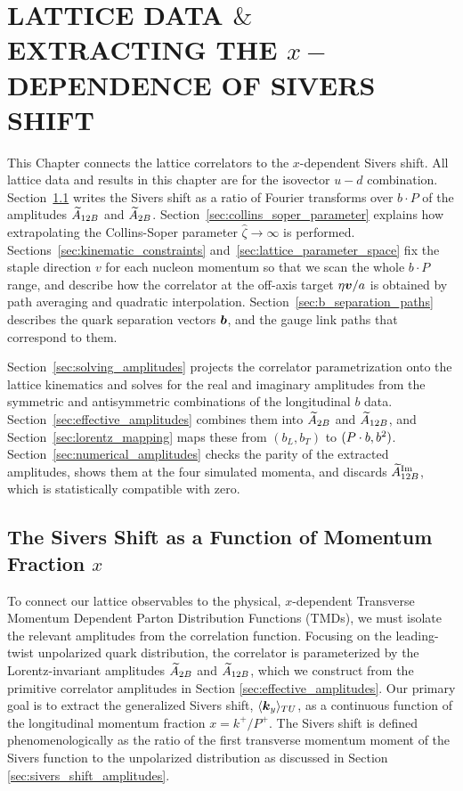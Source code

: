 \section{LATTICE DATA \texorpdfstring{$\&$}{\&} EXTRACTING THE \texorpdfstring{$x-$}{x-}DEPENDENCE OF SIVERS SHIFT}
\label{sec:x_dependence}

This Chapter connects the lattice correlators to the $x$-dependent Sivers shift. All lattice data and results in this chapter are for the isovector $u-d$ combination. Section~\ref{sec:sivers_shift_x} writes the Sivers shift as a ratio of Fourier transforms over $b\cdot P$ of the amplitudes $\widetilde{A}_{12B}$ and $\widetilde{A}_{2B}$. Section~\ref{sec:collins_soper_parameter} explains how extrapolating the Collins-Soper parameter $\hat{\zeta} \to \infty$ is performed. Sections~\ref{sec:kinematic_constraints} and~\ref{sec:lattice_parameter_space} fix the staple direction $v$ for each nucleon momentum so that we scan the whole $b\cdot P$ range, and describe how the correlator at the off-axis target $\eta \boldsymbol{v}/a$ is obtained by path averaging and quadratic interpolation. Section~\ref{sec:b_separation_paths} describes the quark separation vectors $\boldsymbol{b}$, and the gauge link paths that correspond to them.

Section~\ref{sec:solving_amplitudes} projects the correlator parametrization onto the lattice kinematics and solves for the real and imaginary amplitudes from the symmetric and antisymmetric combinations of the longitudinal $b$ data. Section~\ref{sec:effective_amplitudes} combines them into $\widetilde{A}_{2B}$ and $\widetilde{A}_{12B}$, and Section~\ref{sec:lorentz_mapping} maps these from $(b_L,b_T)$ to $(P\cdot b,b^2)$. Section~\ref{sec:numerical_amplitudes} checks the parity of the extracted amplitudes, shows them at the four simulated momenta, and discards $\widetilde{A}_{12B}^{\text{Im}}$, which is statistically compatible with zero.

\subsection{The Sivers Shift as a Function of Momentum Fraction \texorpdfstring{$x$}{x}}
\label{sec:sivers_shift_x}
To connect our lattice observables to the physical, $x$-dependent Transverse Momentum Dependent Parton Distribution Functions (TMDs), we must isolate the relevant amplitudes from the correlation function. Focusing on the leading-twist unpolarized quark distribution, the correlator is parameterized by the Lorentz-invariant amplitudes $\widetilde{A}_{2B}$ and $\widetilde{A}_{12B}$, which we construct from the primitive correlator amplitudes in Section \ref{sec:effective_amplitudes}.
Our primary goal is to extract the generalized Sivers shift, $\langle \boldsymbol{k}_y \rangle_{TU}$, as a continuous function of the longitudinal momentum fraction $x = k^+ / P^+$. The Sivers shift is defined phenomenologically as the ratio of the first transverse momentum moment of the Sivers function to the unpolarized distribution as discussed in Section \ref{sec:sivers_shift_amplitudes}. 

